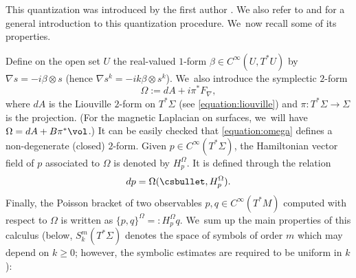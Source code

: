 This quantization was introduced by the first author \cite{Charles-00}. We
also refer to \cite[\S 3.2]{Cekic-Lefeuvre-24} and \cite[\S 2]{Charles--23} for a general introduction to this quantization procedure. We~now recall some of its properties.

Define on the open set $U$ the real-valued $1$-form $\beta \in C^\infty(U,T^*U)$ by $\nabla s = -i \beta \otimes s$ (hence $\nabla s^{k} = -i k \beta \otimes s^{k}$). We~also introduce the symplectic $2$-form
\begin{equation}
\label{equation:omega}
\Omega := dA + i \pi^* F_\nabla,
\end{equation}
where $dA$ is the Liouville $2$-form on $T^*\Sigma$ (see \eqref{equation:liouville}) and $\pi : T^*\Sigma \to \Sigma$ is the projection. (For the magnetic Laplacian on surfaces, we~will have $\Omega = dA + B \pi^*\vol$.) It can be easily checked that \eqref{equation:omega} defines a non-degenerate (closed) $2$-form. Given $p \in C^\infty(T^*\Sigma)$, the Hamiltonian vector field of $p$ associated to $\Omega$ is denoted by $H_p^\Omega$. It is defined through the relation
\[
dp = \Omega(\csbullet, H_p^\Omega).
\]
Finally, the Poisson bracket of two observables $p,q \in C^\infty(T^*M)$ computed with respect to $\Omega$ is written as $\{p,q\}^\Omega =: H^\Omega_p q$. We~sum up the main properties of this calculus (below, $S^m_k(T^*\Sigma)$ denotes the space of symbols of order $m$ which may depend on $k \geq 0$; however, the symbolic estimates are required to be uniform in $k$):

